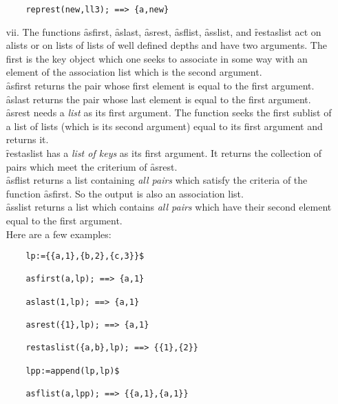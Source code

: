 \begin{itemize}
\begin{verbatim}
    represt(new,ll3); ==> {a,new}
\end{verbatim}
\item[vii.]
\hypertarget{operator:ASFIRST}{}
\hypertarget{operator:ASLAST}{}
\hypertarget{operator:ASREST}{}
\hypertarget{operator:ASFLIST}{}
\hypertarget{operator:ASSLIST}{}
\hypertarget{operator:RESTASLIST}{}
The functions \f{asfirst}, \f{aslast}, \f{asrest}, \f{asflist}, \f{asslist}, and \f{restaslist}
act on alists or on lists of lists of well defined depths
and have two arguments. The first is the key object
which one seeks to associate in some way with an element of the association
list which is the second argument.\\
\f{asfirst} returns the pair whose first element is equal to the
first argument.\\
\f{aslast} returns the pair whose last element is equal to the first
argument.\\
\f{asrest} needs a \emph{list} as its first argument. The function
seeks the first sublist of a list of lists (which is its second argument)
equal to its first argument and returns it.\\
\f{restaslist} has a \emph{list of keys} as its first argument. It
returns the collection of pairs which meet the criterium of \f{asrest}.\\
\f{asflist} returns a list containing \emph{all pairs} which
satisfy the criteria of the function \f{asfirst}. So the output
is also an association list.\\
\f{asslist} returns a list which contains \emph{all pairs} which have
their second element equal to the first argument.\\
Here are a few examples:
\begin{verbatim}
    lp:={{a,1},{b,2},{c,3}}$

    asfirst(a,lp); ==> {a,1}

    aslast(1,lp); ==> {a,1}

    asrest({1},lp); ==> {a,1}

    restaslist({a,b},lp); ==> {{1},{2}}

    lpp:=append(lp,lp)$

    asflist(a,lpp); ==> {{a,1},{a,1}}


\end{verbatim}
\end{itemize}
